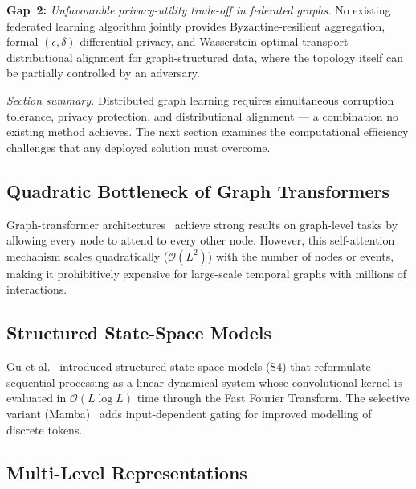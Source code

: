 \medskip
\noindent\textbf{Gap~2:} \emph{Unfavourable privacy-utility trade-off in federated graphs.} No existing federated learning algorithm jointly provides Byzantine-resilient aggregation, formal $(\epsilon,\delta)$-differential privacy, and Wasserstein optimal-transport distributional alignment for graph-structured data, where the topology itself can be partially controlled by an adversary.

\medskip
\noindent\textit{Section summary.} Distributed graph learning requires simultaneous corruption tolerance, privacy protection, and distributional alignment --- a combination no existing method achieves. The next section examines the computational efficiency challenges that any deployed solution must overcome.

\label{sec:efficiency}%

\subsection{Quadratic Bottleneck of Graph Transformers}

Graph-transformer architectures~\cite{Vaswani2017,Ying2021} achieve strong results on graph-level tasks by allowing every node to attend to every other node. However, this self-attention mechanism scales quadratically ($\mathcal{O}(L^2)$) with the number of nodes or events, making it prohibitively expensive for large-scale temporal graphs with millions of interactions.

\subsection{Structured State-Space Models}

Gu et al.~\cite{Gu2022} introduced structured state-space models (S4) that reformulate sequential processing as a linear dynamical system whose convolutional kernel is evaluated in $\mathcal{O}(L\log L)$ time through the Fast Fourier Transform. The selective variant (Mamba)~\cite{Dao2024} adds input-dependent gating for improved modelling of discrete tokens.

\subsection{Multi-Level Representations}

